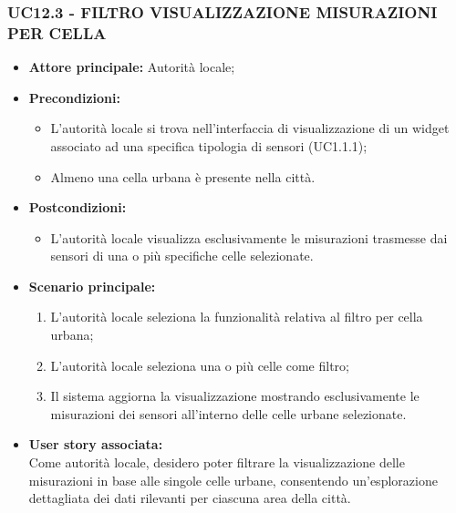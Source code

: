 \subsubsection{UC12.3 - FILTRO VISUALIZZAZIONE MISURAZIONI PER CELLA}
\begin{itemize}
    \item \textbf{Attore principale:} Autorità locale;
    \item \textbf{Precondizioni:}
        \begin{itemize}
            \item L'autorità locale si trova nell'interfaccia di visualizzazione di un widget associato ad una specifica tipologia di sensori (UC1.1.1);
            \item Almeno una cella urbana è presente nella città. 
        \end{itemize}
    \item \textbf{Postcondizioni:}
          \begin{itemize}
              \item L'autorità locale visualizza esclusivamente le misurazioni trasmesse dai sensori di una o più specifiche celle selezionate.
          \end{itemize}
    \item \textbf{Scenario principale:}
          \begin{enumerate}
              \item L'autorità locale seleziona la funzionalità relativa al filtro per cella urbana;
              \item L'autorità locale seleziona una o più celle come filtro;
              \item Il sistema aggiorna la visualizzazione mostrando esclusivamente le misurazioni dei sensori all'interno delle celle urbane selezionate.
          \end{enumerate}
    \item \textbf{User story associata:} \\
        Come autorità locale, desidero poter filtrare la visualizzazione delle misurazioni in base alle singole celle urbane, consentendo un'esplorazione dettagliata dei dati rilevanti per ciascuna area della città.
\end{itemize}
